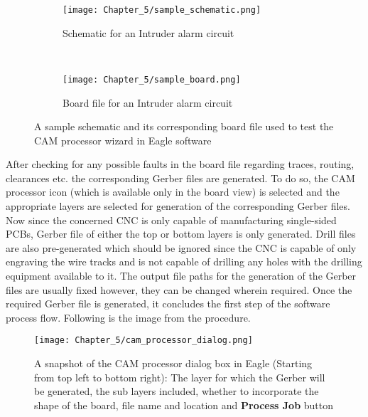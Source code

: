 \begin{figure}[h]
 \begin{center}
  \hspace{-45mm}
  \begin{subfigure}{0.5\textwidth}
   \texttt{[image: Chapter\_5/sample\_schematic.png]}
   \caption{Schematic for an Intruder alarm circuit}
   \label{fig:ckt_sch}
  \end{subfigure} \\
 \end{center}
 \begin{center}
  \begin{subfigure}{0.5\textwidth}
   \texttt{[image: Chapter\_5/sample\_board.png]}
   \caption{Board file for an Intruder alarm circuit}
   \label{fig:ckt_brd}
  \end{subfigure}
 \end{center}

 \caption{A sample schematic and its corresponding board file used to test the CAM processor wizard in Eagle software}
 \label{fig:sample_ckt}
\end{figure}


After checking for any possible faults in the board file regarding traces, routing, clearances etc. the corresponding Gerber files are generated. To do so, the CAM processor icon (which is available only in the board view) is selected and the appropriate layers are selected for generation of the corresponding Gerber files. Now since the concerned CNC is only capable of manufacturing single-sided PCBs, Gerber file of either the top or bottom layers is only generated. Drill files are also pre-generated which should be ignored since the CNC is capable of only engraving the wire tracks and is not capable of drilling any holes with the drilling equipment available to it. The output file paths for the generation of the Gerber files are usually fixed however, they can be changed wherein required. Once the required Gerber file is generated, it concludes the first step of the software process flow. Following is the image from the procedure. \pagebreak

\begin{figure}[h]
 \centering
 \texttt{[image: Chapter\_5/cam\_processor\_dialog.png]}
 \caption{A snapshot of the CAM processor dialog box in Eagle (Starting from top left to bottom right): The layer for which the Gerber will be generated, the sub layers included, whether to incorporate the shape of the board, file name and location and \textbf{Process Job} button}
 \label{fig:cam_dialog}
\end{figure}


